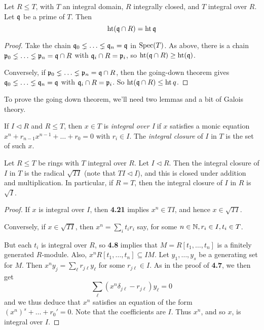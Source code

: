 \documentclass[10pt,a4paper]{article}
\begin{document}
\begin{corollary}
  Let $R \leq T$, with $T$ an integral domain, $R$ integrally closed, and $T$ integral over $R$. Let $\mathfrak{q}$ be a prime of $T$. Then
  \[\operatorname{ht}(\mathfrak{q}\cap R) = \operatorname{ht}{\mathfrak{q}}\]
\end{corollary}
\begin{proof}
  Take the chain $\mathfrak{q}_0 \lneq \ldots \lneq \mathfrak{q}_n = \mathfrak{q}$ in $\operatorname{Spec}(T)$. As above, there is a chain $\mathfrak{p}_0 \lneq \ldots \lneq \mathfrak{p}_n = \mathfrak{q}\cap R$ with $\mathfrak{q}_i \cap R = \mathfrak{p}_i$, so $\operatorname{ht}(\mathfrak{q}\cap R) \geq \operatorname{ht}(\mathfrak{q})$.

  Conversely, if $\mathfrak{p}_0 \lneq \ldots \lneq \mathfrak{p}_n = \mathfrak{q}\cap R$, then the going-down theorem gives $\mathfrak{q}_0 \lneq \ldots \lneq \mathfrak{q}_n = \mathfrak{q}$ with $\mathfrak{q}_i \cap R = \mathfrak{p}_i$. So $\operatorname{ht}(\mathfrak{q}\cap R) \leq \operatorname{ht}{q}$.
\end{proof}
To prove the going down theorem, we'll need two lemmas and a bit of Galois theory.
\begin{definition}
  If $I \triangleleft R$ and $R \leq T$, then $x \in T$ is \emph{integral over I} if $x$ satisfies a monic equation $x^n+r_{n-1}x^{n-1} + \ldots +r_0 = 0$ with $r_i \in I$. The \emph{integral closure} of $I$ in $T$ is the set of such $x$.
\end{definition}
\begin{lemma}
  Let $R \leq T$ be rings with $T$ integral over $R$. Let $I \triangleleft R$. Then the integral closure of $I$ in $T$ is the radical $\sqrt{TI}$ (note that $TI \triangleleft I$), and this is closed under addition and multiplication. In particular, if $R = T$, then the integral closure of $I$ in $R$ is $\sqrt{I}$.
\end{lemma}
\begin{proof}
  If $x$ is integral over $I$, then \textbf{4.21} implies $x^n \in TI$, and hence $x \in \sqrt{TI}$.

  Conversely, if $x \in \sqrt{TI}$, then $x^n = \sum_{i} t_i r_i$ say, for some $n \in \mathbb{N}, r_i \in I, t_i \in T$.

  But each $t_i$ is integral over $R$, so \textbf{4.8} implies that $M = R[t_1, \ldots, t_n]$ is a finitely generated $R$-module. Also, $x^n R[t_1, \ldots, t_n] \subseteq IM$. Let $y_1, \ldots, y_s$ be a generating set for $M$. Then $x^ny_j = \sum_\ell r_{j\ell} y_\ell$ for some $r_{j\ell} \in I$. As in the proof of \textbf{4.7}, we then get
  \[\sum_\ell (x^n\delta_{j\ell} - r_{j\ell})y_\ell = 0\]
  and we thus deduce that $x^n$ satisfies an equation of the form $(x^n)^s + \ldots +r_0'=0$. Note that the coefficients are $I$. Thus $x^n$, and so $x$, is integral over $I$.
\end{proof}
\end{document}
